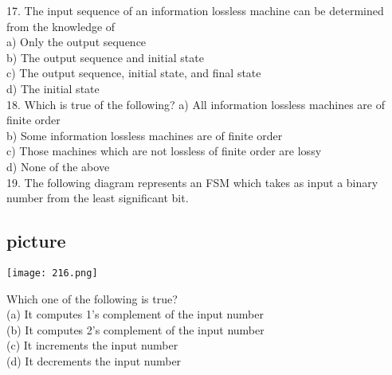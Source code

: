 \documentclass{article}
\begin{document}
\begin{multicols}{2}
\vspace*{0.3cm}
17. The input sequence of an information lossless
machine can be determined from the
knowledge of\\
\hspace*{0.4cm} a) Only the output sequence\\
\hspace*{0.4cm} b) The output sequence and initial state\\
\hspace*{0.4cm} c) The output sequence, initial state, and
final state\\
\hspace*{0.4cm} d) The initial state\\

\vspace*{0.3cm}
18. Which is true of the following?
\hspace*{0.4cm} a) All information lossless machines are
of finite order\\
\hspace*{0.4cm} b) Some information lossless machines
are of finite order\\
\hspace*{0.4cm} c) Those machines which are not lossless
of finite order are lossy\\
\hspace*{0.4cm} d) None of the above\\

\vspace*{0.3cm}
19. The following diagram represents an FSM
which takes as input a binary number from
the least significant bit.\\
\begin{center}
\section{picture}
\texttt{[image: 216.png]}
\end{center}
\hspace*{0.4cm} Which one of the following is true?\\
\hspace*{0.4cm} (a) It computes 1's complement of the
input number\\
\hspace*{0.4cm} (b) It computes 2's complement of the
input number\\
\hspace*{0.4cm} (c) It increments the input number\\
\hspace*{0.4cm} (d) It decrements the input number\\
\end{multicols}
\end{document}

